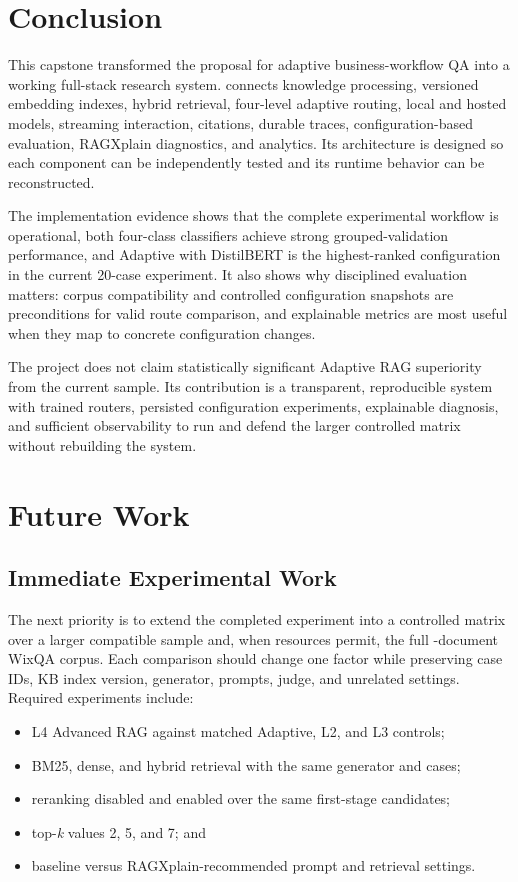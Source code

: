 \section{Conclusion}

This capstone transformed the proposal for adaptive business-workflow QA into a
working full-stack research system. \SystemName{} connects knowledge
processing, versioned embedding indexes, hybrid retrieval, four-level adaptive
routing, local and hosted models, streaming interaction, citations, durable
traces, configuration-based evaluation, RAGXplain diagnostics, and analytics.
Its architecture is designed so each component can be independently tested and
its runtime behavior can be reconstructed.

The implementation evidence shows that the complete experimental workflow is
operational, both four-class classifiers achieve strong grouped-validation
performance, and Adaptive with DistilBERT is the highest-ranked configuration
in the current 20-case experiment. It also shows why disciplined evaluation
matters: corpus compatibility and controlled configuration snapshots are
preconditions for valid route comparison, and explainable metrics are most
useful when they map to concrete configuration changes.

The project does not claim statistically significant Adaptive RAG superiority
from the current sample. Its contribution is a transparent, reproducible
system with trained routers, persisted configuration experiments, explainable
diagnosis, and sufficient observability to run and defend the larger controlled
matrix without rebuilding the system.

\section{Future Work}

\subsection{Immediate Experimental Work}

The next priority is to extend the completed experiment into a controlled
matrix over a larger compatible sample and, when resources permit, the full
\PreparedCorpusDocuments-document WixQA corpus. Each comparison should change
one factor while preserving case IDs, KB index version, generator, prompts,
judge, and unrelated settings. Required experiments include:

\begin{itemize}
  \item L4 Advanced RAG against matched Adaptive, L2, and L3 controls;
  \item BM25, dense, and hybrid retrieval with the same generator and cases;
  \item reranking disabled and enabled over the same first-stage candidates;
  \item top-\textit{k} values 2, 5, and 7; and
  \item baseline versus RAGXplain-recommended prompt and retrieval settings.
\end{itemize}

